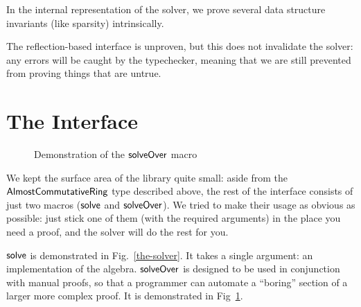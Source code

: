 \documentclass[acmsmall, screen, nonacm, timestamp, review]{acmart}
\theoremstyle{definition}
\theoremstyle{definition}
\begin{document}
In the internal representation of the solver, we prove several data structure
invariants (like sparsity) intrinsically.

The reflection-based interface is unproven, but this does not invalidate the
solver: any errors will be caught by the typechecker, meaning that we are still
prevented from proving things that are untrue.
\section{The Interface}
\begin{figure}
  \vspace{-20pt}
  \caption{Demonstration of the \(\AgdaMacro{solveOver}\) macro}
  \label{solveOver}
  \vspace{-10pt}
\end{figure}
We kept the surface
area of the library quite small: aside from the
\(\AgdaDatatype{AlmostCommutativeRing}\) type described above, the rest of the
interface consists of just two macros (\(\AgdaMacro{solve}\) and
\(\AgdaMacro{solveOver}\)). We tried to make their usage as obvious as possible:
just stick one of them (with the required arguments) in the place you need a
proof, and the solver will do the rest for you.

\(\AgdaMacro{solve}\) is demonstrated in Fig.~\ref{the-solver}. It takes a
single argument: an implementation of the algebra. \(\AgdaMacro{solveOver}\) is
designed to be used in conjunction with manual proofs, so that a programmer can
automate a ``boring'' section of a larger more complex proof. It is demonstrated
in Fig~\ref{solveOver}.
\end{document}
